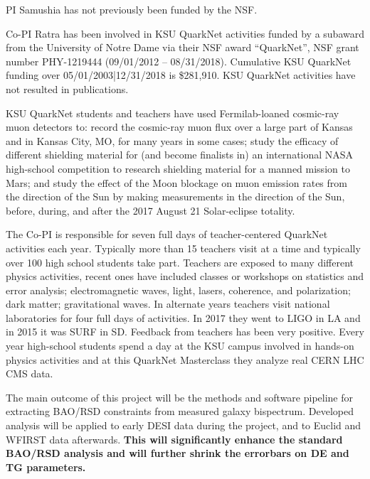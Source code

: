 
PI Samushia has not previously been funded by the NSF.

Co-PI Ratra has been involved in  KSU QuarkNet activities funded by a subaward
from the University of Notre Dame via their NSF award ``QuarkNet'', NSF grant
number PHY-1219444 (09/01/2012 -- 08/31/2018).  Cumulative KSU QuarkNet funding
over 05/01/2003|12/31/2018 is \$281,910. KSU QuarkNet activities have not
resulted in publications. 

KSU QuarkNet students and teachers have used Fermilab-loaned cosmic-ray muon
detectors to: record the cosmic-ray muon flux over a large part of Kansas and
in Kansas City, MO, for many years in some cases; study the efficacy of
different shielding material for (and become finalists in) an international
NASA high-school competition to research shielding material for a manned
mission to Mars; and study the effect of the Moon blockage on muon emission
rates from the direction of the Sun by making measurements in the direction of
the Sun, before, during, and after the 2017 August 21 Solar-eclipse totality.

The Co-PI is responsible for seven full days of teacher-centered QuarkNet
activities each year. Typically more than 15 teachers visit at a time and
typically over 100 high school students take part. Teachers are exposed to many
different physics activities, recent ones have included classes or workshops on
statistics and error analysis; electromagnetic waves, light, lasers, coherence,
and polarization; dark matter; gravitational waves.  In alternate years
teachers visit national laboratories for four full days of activities. In 2017
they went to LIGO in LA and in 2015 it was SURF in SD.  Feedback from teachers
has been very positive. Every year high-school students spend a day at the KSU
campus involved in hands-on physics activities and at this QuarkNet Masterclass
they analyze real CERN LHC CMS data.


The main outcome of this project will be the methods and software pipeline for
extracting BAO/RSD constraints from measured galaxy bispectrum. Developed
analysis will be applied to early DESI data during the project, and to Euclid
and WFIRST data afterwards. \textbf{This will significantly enhance the
standard BAO/RSD analysis and will further shrink the errorbars on DE and TG
parameters.}

